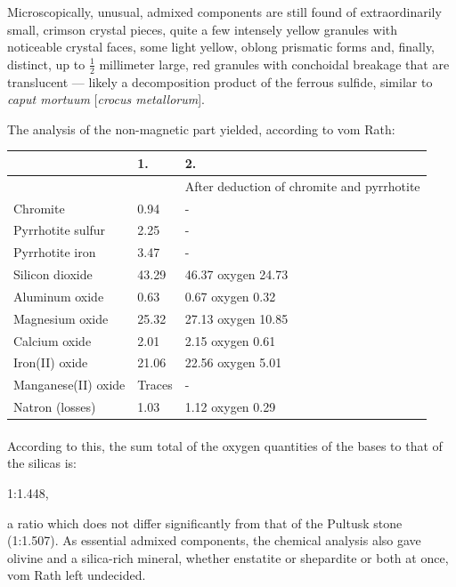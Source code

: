 \documentclass[a4paper, 12pt, oneside]{article}
\begin{document}
Microscopically, unusual, admixed components are still found of extraordinarily small, crimson crystal pieces, quite a few intensely yellow granules with noticeable crystal faces, some light yellow, oblong prismatic forms and, finally, distinct, up to $\frac{1}{2}$ millimeter large, red granules with conchoidal breakage that are translucent --- likely a decomposition product of the ferrous sulfide, similar to \emph{caput mortuum} [\emph{crocus metallorum}].

The analysis of the non-magnetic part yielded, according to vom Rath:
\begin{center}
    \begin{tabular}{ |l|p{1.4cm}|p{3.5cm}| }
        \hline
        & 1. & 2.\\\hline
        & & After deduction of chromite and pyrrhotite\\\hline
        Chromite & 0.94 & -\\\hline
        Pyrrhotite sulfur & 2.25 & -\\\hline
        Pyrrhotite iron & 3.47 & -\\\hline
        Silicon dioxide & 43.29 & 46.37 oxygen 24.73\\\hline
        Aluminum oxide & 0.63 & 0.67 oxygen 0.32\\\hline
        Magnesium oxide & 25.32 & 27.13 oxygen 10.85\\\hline
        Calcium oxide & 2.01 & 2.15 oxygen 0.61\\\hline
        Iron(II) oxide & 21.06 & 22.56 oxygen 5.01\\\hline
        Manganese(II) oxide & Traces & -\\\hline
        Natron (losses) & 1.03 & 1.12 oxygen 0.29\\
        \hline
    \end{tabular}
\end{center}
\paragraph*{}
According to this, the sum total of the oxygen quantities of the bases to that of the silicas is:

1:1.448,

a ratio which does not differ significantly from that of the Pultusk stone (1:1.507). As essential admixed components, the chemical analysis also gave olivine and a silica-rich mineral, whether enstatite or shepardite or both at once, vom Rath left undecided.
\end{document}
